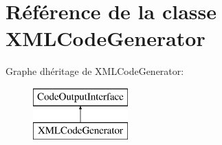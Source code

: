 \hypertarget{class_x_m_l_code_generator}{}\section{Référence de la classe X\+M\+L\+Code\+Generator}
\label{class_x_m_l_code_generator}
Graphe d\textquotesingle{}héritage de X\+M\+L\+Code\+Generator\+:\begin{figure}[H]
\begin{center}
\leavevmode
\includegraphics[height=2.000000cm]{class_x_m_l_code_generator}
\end{center}
\end{figure}
